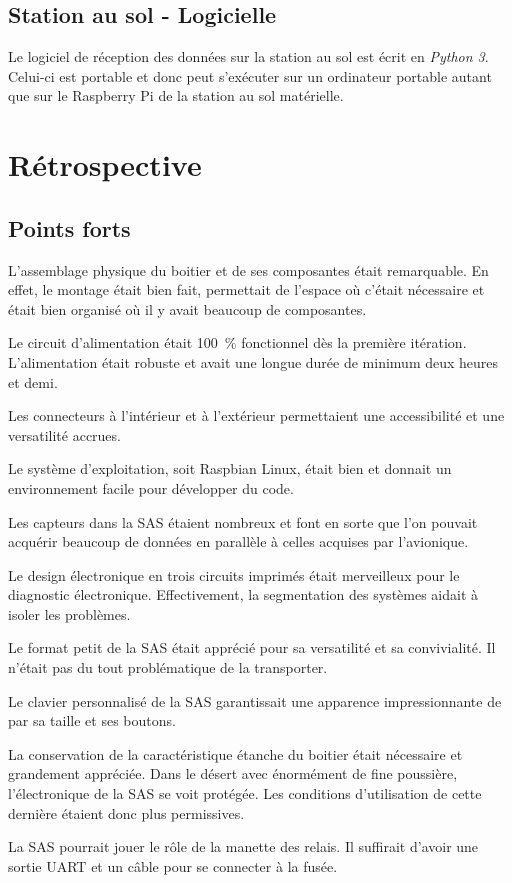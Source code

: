 \subsection{Station au sol - Logicielle}

Le logiciel de réception des données sur la station au sol est écrit en
\textit{Python 3}. Celui-ci est portable et donc peut s'exécuter sur un
ordinateur portable autant que sur le Raspberry Pi de la station au sol
matérielle.

\section{Rétrospective}

\subsection{Points forts}

L’assemblage physique du boitier et de ses composantes était remarquable.
En effet, le montage était bien fait, permettait de l’espace où c’était
nécessaire et était bien organisé où il y avait beaucoup de composantes.
\par
Le circuit d’alimentation était 100~\% fonctionnel dès la première itération.
L’alimentation était robuste et avait une longue durée de minimum deux heures
et demi.
\par
Les connecteurs à l’intérieur et à l’extérieur permettaient une accessibilité
et une versatilité accrues.
\par
Le système d’exploitation, soit Raspbian Linux, était bien et donnait un
environnement facile pour développer du code.
\par
Les capteurs dans la SAS étaient nombreux et font en sorte que l’on pouvait
acquérir beaucoup de données en parallèle à celles acquises par l’avionique.
\par
Le design électronique en trois circuits imprimés était merveilleux pour le
diagnostic électronique. Effectivement, la segmentation des systèmes aidait à
isoler les problèmes.
\par
Le format petit de la SAS était apprécié pour sa versatilité et sa
convivialité. Il n’était pas du tout problématique de la transporter.
\par
Le clavier personnalisé de la SAS garantissait une apparence impressionnante de
par sa taille et ses boutons.
\par
La conservation de la caractéristique étanche du boitier était nécessaire et
grandement appréciée. Dans le désert avec énormément de fine poussière,
l’électronique de la SAS se voit protégée. Les conditions d’utilisation de
cette dernière étaient donc plus permissives.
\par
La SAS pourrait jouer le rôle de la manette des relais. Il suffirait d'avoir une
sortie UART et un câble pour se connecter à la fusée.

